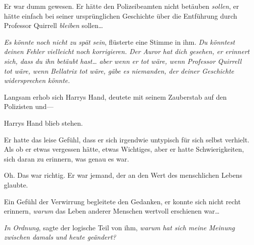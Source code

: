 Er war dumm gewesen. Er hätte den Polizeibeamten nicht betäuben \emph{sollen}, er hätte einfach bei seiner ursprünglichen Geschichte über die Entführung durch Professor Quirrell \emph{bleiben} sollen…

\emph{Es könnte noch nicht zu spät sein}, flüsterte eine Stimme in ihm. \emph{Du könntest deinen Fehler vielleicht noch korrigieren. Der Auror hat dich gesehen, er erinnert sich, dass du ihn betäubt hast… aber wenn er tot wäre, wenn Professor Quirrell tot wäre, wenn Bellatrix tot wäre, gäbe es niemanden, der deiner Geschichte widersprechen könnte.}

Langsam erhob sich Harrys Hand, deutete mit seinem Zauberstab auf den Polizisten und—

Harrys Hand blieb stehen.

Er hatte das leise Gefühl, dass er sich irgendwie untypisch für sich selbst verhielt. Als ob er etwas vergessen hätte, etwas Wichtiges, aber er hatte Schwierigkeiten, sich daran zu erinnern, was genau es war.

Oh. Das war richtig. Er war jemand, der an den Wert des menschlichen Lebens glaubte.

Ein Gefühl der Verwirrung begleitete den Gedanken, er konnte sich nicht recht erinnern, \emph{warum} das Leben anderer Menschen wertvoll erschienen war…

\emph{In Ordnung}, sagte der logische Teil von ihm, \emph{warum hat sich meine Meinung zwischen damals und heute geändert?}

